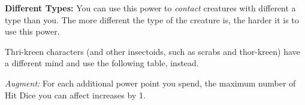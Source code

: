 {	\textbf{Different Types:} You can use this power to \emph{contact} creatures with different a type than you. The more different the type of the creature is, the harder it is to use this power.


	Thri-kreen characters (and other insectoids, such as scrabs and thor-kreen) have a different mind and use the following table, instead.


	\textit{Augment:} For each additional power point you spend, the maximum number of Hit Dice you can affect increases by 1.
}